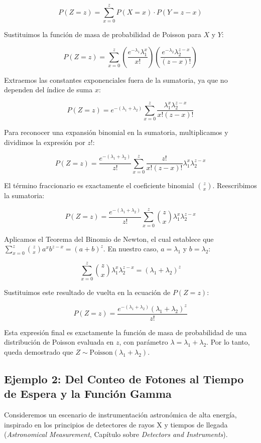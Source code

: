 $$ P(Z = z) = \sum_{x=0}^{z} P(X = x) \cdot P(Y = z - x) $$

Sustituimos la función de masa de probabilidad de Poisson para $X$ y $Y$:

$$ P(Z = z) = \sum_{x=0}^{z} \left( \frac{e^{-\lambda_1} \lambda_1^x}{x!} \right) \left( \frac{e^{-\lambda_2} \lambda_2^{z-x}}{(z-x)!} \right) $$

Extraemos las constantes exponenciales fuera de la sumatoria, ya que no dependen del índice de suma $x$:

$$ P(Z = z) = e^{-(\lambda_1 + \lambda_2)} \sum_{x=0}^{z} \frac{\lambda_1^x \lambda_2^{z-x}}{x! (z-x)!} $$

Para reconocer una expansión binomial en la sumatoria, multiplicamos y dividimos la expresión por $z!$:

$$ P(Z = z) = \frac{e^{-(\lambda_1 + \lambda_2)}}{z!} \sum_{x=0}^{z} \frac{z!}{x! (z-x)!} \lambda_1^x \lambda_2^{z-x} $$

El término fraccionario es exactamente el coeficiente binomial $\binom{z}{x}$. Reescribimos la sumatoria:

$$ P(Z = z) = \frac{e^{-(\lambda_1 + \lambda_2)}}{z!} \sum_{x=0}^{z} \binom{z}{x} \lambda_1^x \lambda_2^{z-x} $$

Aplicamos el Teorema del Binomio de Newton, el cual establece que $\sum_{x=0}^{z} \binom{z}{x} a^x b^{z-x} = (a + b)^z$. En nuestro caso, $a = \lambda_1$ y $b = \lambda_2$:

$$ \sum_{x=0}^{z} \binom{z}{x} \lambda_1^x \lambda_2^{z-x} = (\lambda_1 + \lambda_2)^z $$

Sustituimos este resultado de vuelta en la ecuación de $P(Z = z)$:

$$ P(Z = z) = \frac{e^{-(\lambda_1 + \lambda_2)} (\lambda_1 + \lambda_2)^z}{z!} $$

Esta expresión final es exactamente la función de masa de probabilidad de una distribución de Poisson evaluada en $z$, con parámetro $\lambda = \lambda_1 + \lambda_2$. Por lo tanto, queda demostrado que $Z \sim \text{Poisson}(\lambda_1 + \lambda_2)$.

\subsection{Ejemplo 2: Del Conteo de Fotones al Tiempo de Espera y la Función Gamma}

Consideremos un escenario de instrumentación astronómica de alta energía, inspirado en los principios de detectores de rayos X y tiempos de llegada (\textit{Astronomical Measurement}, Capítulo sobre \textit{Detectors and Instruments}).

